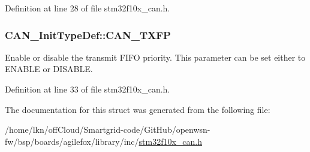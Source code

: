 Definition at line 28 of file stm32f10x\+\_\+can.\+h.

\subsubsection[{\texorpdfstring{C\+A\+N\+\_\+\+T\+X\+FP}{CAN_TXFP}}]{ C\+A\+N\+\_\+\+Init\+Type\+Def\+::\+C\+A\+N\+\_\+\+T\+X\+FP}\hypertarget{struct_c_a_n___init_type_def_a003de4b70fc93b4f820f320c6ea75a16}{}\label{struct_c_a_n___init_type_def_a003de4b70fc93b4f820f320c6ea75a16}
Enable or disable the transmit F\+I\+FO priority. This parameter can be set either to E\+N\+A\+B\+LE or D\+I\+S\+A\+B\+LE. 

Definition at line 33 of file stm32f10x\+\_\+can.\+h.



The documentation for this struct was generated from the following file\+:\begin{DoxyCompactItemize}
\item 
/home/lkn/off\+Cloud/\+Smartgrid-\/code/\+Git\+Hub/openwsn-\/fw/bsp/boards/agilefox/library/inc/\hyperlink{agilefox_2library_2inc_2stm32f10x__can_8h}{stm32f10x\+\_\+can.\+h}\end{DoxyCompactItemize}
